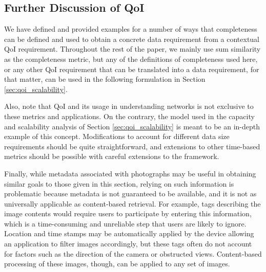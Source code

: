 \subsection{Further Discussion of QoI}
We have defined and provided examples for a number of ways that completeness can be defined and used to obtain a concrete data requirement from a contextual QoI requirement.  Throughout the rest of the paper, we mainly use sum similarity as the completeness metric, but any of the definitions of completeness used here, or any other QoI requirement that can be translated into a data requirement, for that matter, can be used in the following formulation in Section \ref{sec:qoi_scalability}.

Also, note that QoI and its usage in understanding networks is not exclusive to these metrics and applications.  On the contrary, the model used in the capacity and scalability analysis of Section \ref{sec:qoi_scalability} is meant to be an in-depth example of this concept.  Modifications to account for different data size requirements should be quite straightforward, and extensions to other time-based metrics should be possible with careful extensions to the framework.

Finally, while metadata associated with photographs may be useful in obtaining similar goals to those given in this section, relying on such information is problematic because metadata is not guaranteed to be available, and it is not as universally applicable as content-based retrieval.  For example, tags describing the image contents would require users to participate by entering this information, which is a time-consuming and unreliable step that users are likely to ignore.  Location and time stamps may be automatically applied by the device allowing an application to filter images accordingly, but these tags often do not account for factors such as the direction of the camera or obstructed views.  Content-based processing of these images, though, can be applied to any set of images.



